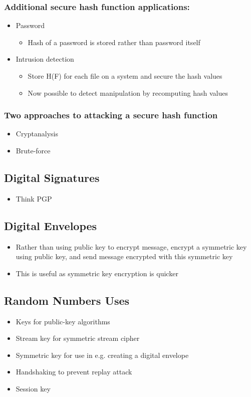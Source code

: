 \documentclass[11pt]{article}
\begin{document}
\subsubsection{Additional secure hash function applications:}
\label{sec:orge0f7048}
\begin{itemize}
\item Password
\begin{itemize}
\item Hash of a password is stored rather than password itself
\end{itemize}
\item Intrusion detection
\begin{itemize}
\item Store H(F) for each file on a system and secure the hash values
\item Now possible to detect manipulation by recomputing hash values
\end{itemize}
\end{itemize}
\subsubsection{Two approaches to attacking a secure hash function}
\label{sec:orgf9b79f1}
\begin{itemize}
\item Cryptanalysis
\item Brute-force
\end{itemize}
\subsection{Digital Signatures}
\label{sec:orgc65b0e8}
\begin{itemize}
\item Think PGP
\end{itemize}
\subsection{Digital Envelopes}
\label{sec:org793618c}
\begin{itemize}
\item Rather than using public key to encrypt message, encrypt a symmetric key using public key, and send message encrypted with this symmetric key
\item This is useful as symmetric key encryption is quicker
\end{itemize}
\subsection{Random Numbers Uses}
\label{sec:orga1923fe}
\begin{itemize}
\item Keys for public-key algorithms
\item Stream key for symmetric stream cipher
\item Symmetric key for use in e.g. creating a digital envelope
\item Handshaking to prevent replay attack
\item Session key
\end{itemize}
\end{document}
